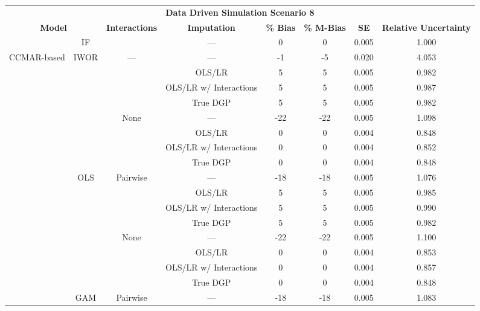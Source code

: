 \begin{table}
\centering
\begin{tabular}[ht]{|>{}c|c|c|c|c|c|c|>{}c|}
\hline
\multicolumn{8}{|c|}{\textbf{Data Driven Simulation Scenario 8}} \\
\cline{1-8}
\multicolumn{2}{|c|}{\textbf{Model}} & \textbf{Interactions} & \textbf{Imputation} & \textbf{\% Bias} & \textbf{\% M-Bias} & \textbf{SE} & \textbf{Relative Uncertainty}\\
\hline
 & IF &  & --- & 0 & 0 & 0.005 & 1.000\\
\cline{2-2}
\cline{4-8}
\multirow{-2}{*}{\centering\arraybackslash CCMAR-based} & IWOR & \multirow{-2}{*}{\centering\arraybackslash ---} & --- & -1 & -5 & 0.020 & 4.053\\
\cline{1-8}
 &  &  & OLS/LR & 5 & 5 & 0.005 & 0.982\\
\cline{4-8}
 &  &  & OLS/LR w/ Interactions & 5 & 5 & 0.005 & 0.987\\
\cline{4-8}
 &  &  & True DGP & 5 & 5 & 0.005 & 0.982\\
\cline{4-8}
 &  & \multirow{-4}{*}{\centering\arraybackslash None} & --- & -22 & -22 & 0.005 & 1.098\\
\cline{3-8}
 &  &  & OLS/LR & 0 & 0 & 0.004 & 0.848\\
\cline{4-8}
 &  &  & OLS/LR w/ Interactions & 0 & 0 & 0.004 & 0.852\\
\cline{4-8}
 &  &  & True DGP & 0 & 0 & 0.004 & 0.848\\
\cline{4-8}
 & \multirow{-8}{*}{\centering\arraybackslash OLS} & \multirow{-4}{*}{\centering\arraybackslash Pairwise} & --- & -18 & -18 & 0.005 & 1.076\\
\cline{2-8}
 &  &  & OLS/LR & 5 & 5 & 0.005 & 0.985\\
\cline{4-8}
 &  &  & OLS/LR w/ Interactions & 5 & 5 & 0.005 & 0.990\\
\cline{4-8}
 &  &  & True DGP & 5 & 5 & 0.005 & 0.982\\
\cline{4-8}
 &  & \multirow{-4}{*}{\centering\arraybackslash None} & --- & -22 & -22 & 0.005 & 1.100\\
\cline{3-8}
 &  &  & OLS/LR & 0 & 0 & 0.004 & 0.853\\
\cline{4-8}
 &  &  & OLS/LR w/ Interactions & 0 & 0 & 0.004 & 0.857\\
\cline{4-8}
 &  &  & True DGP & 0 & 0 & 0.004 & 0.848\\
\cline{4-8}
 & \multirow{-8}{*}{\centering\arraybackslash GAM} & \multirow{-4}{*}{\centering\arraybackslash Pairwise} & --- & -18 & -18 & 0.005 & 1.083\\

\end{tabular}
\end{table}
